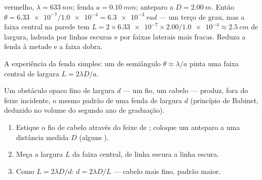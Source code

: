 \begin{example}\label{ex:g12:light-as-wave:slit}
 vermelho, $\lambda = \qty{633}{nm}$; fenda $a = \qty{0.10}{mm}$;
anteparo a $D = \qty{2.00}{m}$. Então
$\theta = \num{6.33e-7} / \num{1.0e-4} = \qty{6.3e-3}{rad}$ --- um terço
de grau, mas a faixa central na parede tem
$L = 2 \times \num{6.33e-7} \times 2.00 / \num{1.0e-4} \approx
\qty{2.5}{cm}$ de largura, ladeada por linhas escuras e por faixas
laterais mais fracas. Reduza a fenda à metade e a faixa dobra.
\end{example}

\begin{omfigure}

{\small A experiência da fenda simples: um  de semiângulo
$\theta \approx \lambda/a$ pinta uma faixa central de largura
$L = 2\lambda D/a$.}
\end{omfigure}

\begin{proposition}\label{prop:g12:light-as-wave:hair}
Um obstáculo opaco fino de largura $d$ --- um fio, um cabelo --- produz,
fora do feixe incidente, o mesmo padrão de uma fenda de largura $d$
(princípio de Babinet, deduzido no volume do segundo ano de graduação).
\end{proposition}
\admitted

\begin{method}\label{met:g12:light-as-wave:hairwidth}
\begin{enumerate}
  \item Estique o fio de cabelo através do feixe de ; coloque um
        anteparo a uma distância medida $D$ (alguns ).
  \item Meça a largura $L$ da faixa central, de linha escura a linha
        escura.
  \item Como $L = 2\lambda D/d$: $d = 2\lambda D/L$ --- cabelo mais fino,
        padrão maior.
\end{enumerate}
\end{method}

